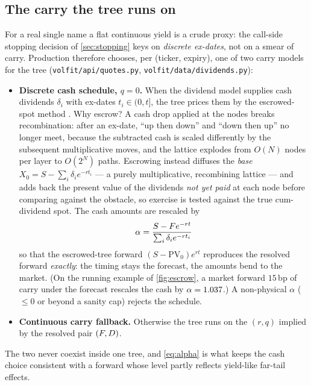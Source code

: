 \documentclass[11pt]{article}
\begin{document}
\subsection{The carry the tree runs on}
\label{sec:carry}

For a real single name a flat continuous yield is a crude proxy: the
call-side stopping decision of \cref{sec:stopping} keys on \emph{discrete
ex-dates}, not on a smear of carry.  Production therefore chooses, per
(ticker, expiry), one of two carry models for the tree
(\texttt{volfit/api/quotes.py}, \texttt{volfit/data/dividends.py}):

\begin{itemize}[leftmargin=1.6em]
\item \textbf{Discrete cash schedule, $q=0$.}  When the dividend model
supplies cash dividends $\delta_i$ with ex-dates $t_i\in(0,t]$, the tree
prices them by the escrowed-spot method \cite{Hull2018}.  Why escrow?  A
cash drop applied at the nodes breaks recombination: after an ex-date,
``up then down'' and ``down then up'' no longer meet, because the
subtracted cash is scaled differently by the subsequent multiplicative
moves, and the lattice explodes from $O(N)$ nodes per layer to $O(2^N)$
paths.  Escrowing instead diffuses the \emph{base}
$X_0=S-\sum_i\delta_ie^{-rt_i}$ --- a purely multiplicative, recombining
lattice --- and adds back the present value of the dividends \emph{not yet
paid} at each node before comparing against the obstacle, so exercise is
tested against the true cum-dividend spot.  The cash amounts are rescaled
by
\begin{equation}
\alpha=\frac{S-F e^{-rt}}{\sum_i \delta_i e^{-rt_i}}
\label{eq:alpha}
\end{equation}
so that the escrowed-tree forward $(S-\mathrm{PV}_0)e^{rt}$ reproduces the
resolved forward \emph{exactly}: the timing stays the forecast, the
amounts bend to the market.  (On the running example of
\cref{fig:escrow}, a market forward $15$\,bp of carry under the forecast
rescales the cash by $\alpha=1.037$.)  A non-physical $\alpha$
($\le0$ or beyond a sanity cap) rejects the schedule.
\item \textbf{Continuous carry fallback.}  Otherwise the tree runs on the
$(r,q)$ implied by the resolved pair $(F,D)$.
\end{itemize}
The two never coexist inside one tree, and \cref{eq:alpha} is what keeps
the cash choice consistent with a forward whose level partly reflects
yield-like far-tail effects.
\end{document}
